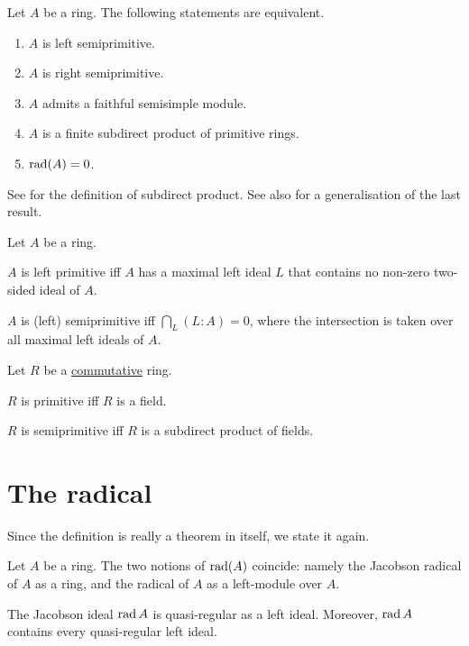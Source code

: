 \documentclass[12pt]{article}
\begin{document}
\begin{thm} \label{thm:semi-primtive-equivalence}
	Let $A$ be a ring. The following statements are equivalent.
	\begin{enumerate}[label=(\alph*)]
		\item $A$ is left semiprimitive.
		\item $A$ is right semiprimitive.
		\item $A$ admits a faithful semisimple module.
		\item $A$ is a finite subdirect product of primitive rings.
		\item $\operatorname{rad}(A) = 0$.
	\end{enumerate}
\end{thm}
See  for the definition of subdirect product. See also  for a generalisation of the last result. 

\begin{thm}
	Let $A$ be a ring.

	$A$ is left primitive iff $A$ has a maximal left ideal $L$ that contains no non-zero two-sided ideal of $A$. 

	$A$ is (left) semiprimitive iff $\bigcap_{L}(L : A) = 0$, where the intersection is taken over all maximal left ideals of $A$.  
\end{thm}

\begin{cor}
	Let $R$ be a \underline{commutative} ring.

	$R$ is primitive iff $R$ is a field. 

	$R$ is semiprimitive iff $R$ is a subdirect product of fields. 
\end{cor}

\section{The radical}

Since the definition is really a theorem in itself, we state it again.

\jacobsonradical

\begin{thm}
	Let $A$ be a ring. The two notions of $\operatorname{rad}(A)$ coincide: namely the Jacobson radical of $A$ as a ring, and the radical of $A$ as a left-module over $A$.
\end{thm}

\begin{thm}
	The Jacobson ideal $\operatorname{rad} A$ is quasi-regular as a left ideal. \newline
	Moreover, $\operatorname{rad} A$ contains every quasi-regular left ideal.
\end{thm}
\end{document}
